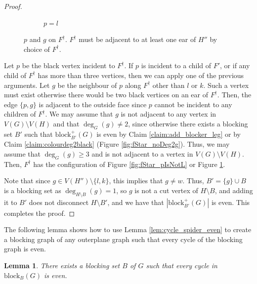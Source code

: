 \documentclass{patmorin}
\newcommand{\block}{\mathrm{block}}
\newtheorem{lemma}[theorem]{Lemma}
\begin{document}
\begin{proof}
\begin{figure}[!ht]
\begin{subfigure}[t]{0.3\textwidth}
    \caption{$p=l$}
    \label{fig:fStar_pIsL}
   
  \end{subfigure}
  
  \caption{$p$ and $g$ on $F^{\dagger}$. $F^{\dagger}$ must be adjacent to at least one ear of $H''$ by choice of $F^{\dagger}$.}
  \label{fig:pgOnFstar}
  
\end{figure}

Let $p$ be the black vertex incident to $F^{\dagger}$. If $p$ is incident to a child of $F'$, or if any child of $F^{\dagger}$ has more than three vertices, then we can apply one of the previous arguments.
Let $g$ be the neighbour of $p$ along $F^{\dagger}$ other than $l$ or $k$. Such a vertex must exist otherwise there would be two black vertices on an ear of $F^{\dagger}$. Then, the edge $\{p,g\}$ is adjacent to the outside face since $p$ cannot be incident to any children of $F^{\dagger}$. We may assume that $g$ is not adjacent to any vertex in $V(G)\setminus V(H)$ and that  $\deg_G(g)\not=2$, since otherwise there exists a blocking set $B'$ such that $\block_{B'}^+(G)$ is even by Claim \ref{claim:add_blocker_leg} or by Claim \ref{claim:colourdeg2black} (Figure \ref{fig:fStar_noDeg2g}). Thus, we may assume that $\deg_G(g)\geq 3$ and is not adjacent to a vertex in  $V(G)\setminus V(H)$. Then, $F^{\dagger}$ has the configuration of Figure \ref{fig:fStar_pIsNotL} or Figure \ref{fig:fStar_pIsL}. 

Note that since $g \in V(H'') \setminus \{l,k\}$, this implies that $g \not= w$. Thus, $B' = \{g\} \cup B$ is a blocking set as $\deg_{H\setminus B}(g)=1$, so $g$ is not a cut vertex of $H\setminus B$, and adding it to $B'$ does not disconnect $H\setminus B'$, and we have that $|\block_{B'}^+(G)|$ is even. This completes the proof. 
\end{proof}
The following lemma shows how to use Lemma \ref{lem:cycle_spider_even} to create a blocking graph of any outerplane graph such that every cycle of the blocking graph is even.

\begin{lemma}
 There exists a blocking set $B$ of $G$ such that every cycle in $\block_{B}(G)$ is even.
 \label{lem:exists_even_blocking_graph}
\end{lemma}
\end{document}
